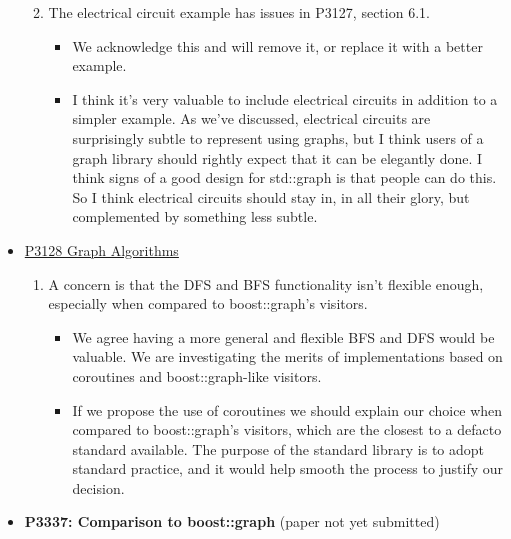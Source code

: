 \begin{itemize}
\begin{enumerate}
\begin{itemize}
                        \end{itemize}
                  \item The electrical circuit example has issues in P3127, section 6.1.
                        \begin{itemize}
                              \item We acknowledge this and will remove it, or replace it with a better example.
                              \item I think it's very valuable to include electrical circuits in addition to a simpler example. As we've discussed, electrical 
                                    circuits are surprisingly subtle to represent using graphs, but I think users of a graph library should rightly expect that 
                                    it can be elegantly done. I think signs of a good design for std::graph is that people can do this. So I think electrical 
                                    circuits should stay in, in all their glory, but complemented by something less subtle. 
                        \end{itemize}
      \end{enumerate}
      \item \href{https://www.wg21.link/P3128}{P3128 Graph Algorithms}
            \begin{enumerate}
                  \item A concern is that the DFS and BFS functionality isn't flexible enough, especially when compared to boost::graph's visitors.
                        \begin{itemize}
                              \item We agree having a more general and flexible BFS and DFS would be valuable. We are investigating the merits 
                                    of implementations based on coroutines and boost::graph-like visitors.
                              \item If we propose the use of coroutines we should explain our choice when compared to boost::graph's visitors, 
                                    which are the closest to a defacto standard available. The purpose of the standard library is to adopt standard 
                                    practice, and it would help smooth the process to justify our decision.
                        \end{itemize}
            \end{enumerate}
      \item \textbf{P3337: Comparison to boost::graph} (paper not yet submitted)

\end{itemize}

